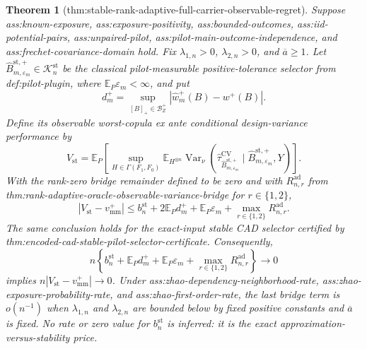 \documentclass{article}
\newtheorem{theorem}{Theorem}
\begin{document}
\begin{theorem}[thm:stable-rank-adaptive-full-carrier-observable-regret]\label{thm:stable-rank-adaptive-full-carrier-observable-regret}
Suppose ass:known-exposure, ass:exposure-positivity, ass:bounded-outcomes, ass:iid-potential-pairs, ass:unpaired-pilot, ass:pilot-main-outcome-independence, and ass:frechet-covariance-domain hold.  Fix \(\lambda_{1,n}>0\), \(\lambda_{2,n}>0\), and \(\overline a\ge1\).  Let \(\widehat B_{m,\varepsilon_m}^{\mathrm{st},+}\in\mathcal K_n^{\mathrm{st}}\) be the classical pilot-measurable positive-tolerance selector from def:pilot-plugin, where \(\mathbb E_P\varepsilon_m<\infty\), and put
\[
d_m^+=\sup_{[B]_+\in\mathcal B_Z^+}
\left|\widehat w_m^+(B)-w^+(B)\right|.
\]
Define its observable worst-copula ex ante conditional design-variance performance by
\[
V_{\mathrm{st}}
=\mathbb E_P\left[
\sup_{H\in\Gamma(F_1,F_0)}
\mathbb E_{H^{\otimes n}}
\operatorname{Var}_\nu\!\left(
\widehat\tau_{\widehat B_{m,\varepsilon_m}^{\mathrm{st},+}}^{\mathrm{CV}}
\mid \widehat B_{m,\varepsilon_m}^{\mathrm{st},+},Y
\right)
\right].
\]
With the rank-zero bridge remainder defined to be zero and with \(R_{n,r}^{\mathrm{ad}}\) from thm:rank-adaptive-oracle-observable-variance-bridge for \(r\in\{1,2\}\),
\[
\left|V_{\mathrm{st}}-v_{\mathrm{mm}}^+\right|
\le b_n^{\mathrm{st}}
+2\mathbb E_Pd_m^+
+\mathbb E_P\varepsilon_m
+\max_{r\in\{1,2\}}R_{n,r}^{\mathrm{ad}}.
\]
The same conclusion holds for the exact-input stable CAD selector certified by thm:encoded-cad-stable-pilot-selector-certificate.  Consequently,
\[
n\left\{
b_n^{\mathrm{st}}+\mathbb E_Pd_m^+
+\mathbb E_P\varepsilon_m
+\max_{r\in\{1,2\}}R_{n,r}^{\mathrm{ad}}
\right\}\longrightarrow0
\]
implies \(n|V_{\mathrm{st}}-v_{\mathrm{mm}}^+|\to0\).  Under ass:zhao-dependency-neighborhood-rate, ass:zhao-exposure-probability-rate, and ass:zhao-first-order-rate, the last bridge term is \(o(n^{-1})\) when \(\lambda_{1,n}\) and \(\lambda_{2,n}\) are bounded below by fixed positive constants and \(\overline a\) is fixed.  No rate or zero value for \(b_n^{\mathrm{st}}\) is inferred: it is the exact approximation-versus-stability price.
\end{theorem}
\end{document}
